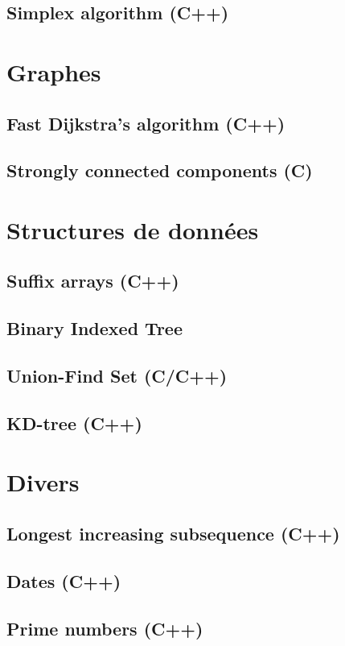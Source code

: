 \documentclass[12pt]{book}
\begin{document}
\section{Simplex algorithm (C++)}
{\tiny}

\chapter{Graphes}

\section{Fast Dijkstra's algorithm (C++)}
{\tiny}

\section{Strongly connected components (C)}
{\tiny}

\chapter{Structures de données}

\section{Suffix arrays (C++)}
{\tiny}

\section{Binary Indexed Tree}
{\tiny}

\section{Union-Find Set (C/C++)}
{\tiny}

\section{KD-tree (C++)}
{\tiny}

\chapter{Divers}

\section{Longest increasing subsequence (C++)}
{\tiny}

\section{Dates (C++)}
{\tiny}

\section{Prime numbers (C++)}
{\tiny}
\end{document}
